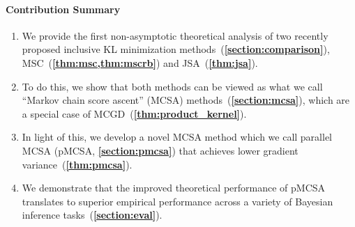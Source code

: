 \vspace{-1.7ex}
\paragraph{Contribution Summary}
\setlength\itemsep{0.01in}
\begin{enumerate}[leftmargin=7mm,listparindent=\parindent]
    \vspace{-1.5ex}
    \item[\ding{182}] We provide the first non-asymptotic theoretical analysis of two recently proposed inclusive KL minimization methods~(\textbf{\cref{section:comparison}}), MSC~(\textbf{\cref{thm:msc,thm:mscrb}}) and JSA~(\textbf{\cref{thm:jsa}}).
    \item[\ding{183}] To do this, we show that both methods can be viewed as what we call ``Markov chain score ascent'' (MCSA) methods~(\textbf{\cref{section:mcsa}}), which are a special case of MCGD~(\textbf{\cref{thm:product_kernel}}).
    \item[\ding{184}] In light of this, we develop a novel MCSA method which we call parallel MCSA (pMCSA, \textbf{\cref{section:pmcsa}}) that achieves lower gradient variance~(\textbf{\cref{thm:pmcsa}}).
    \item[\ding{185}] We demonstrate that the improved theoretical performance of pMCSA translates to superior empirical performance across a variety of Bayesian inference tasks~(\textbf{\cref{section:eval}}).
\end{enumerate}


